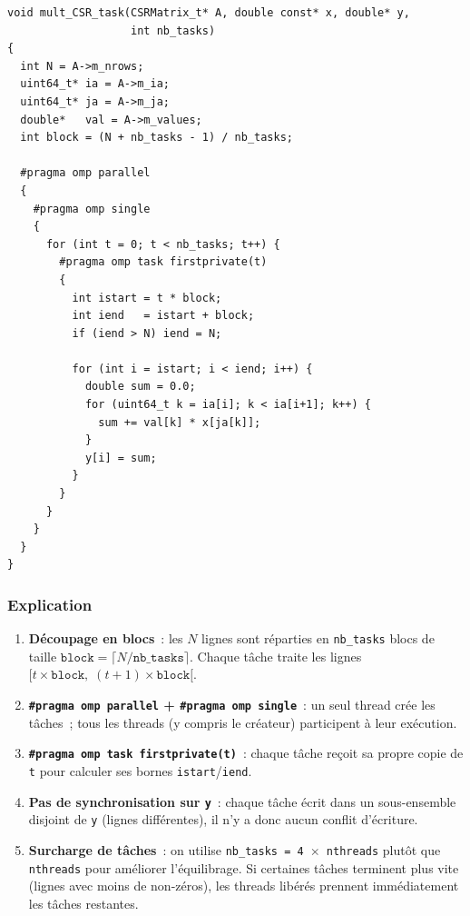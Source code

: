 \documentclass[12pt,a4paper]{article}
\begin{document}
\begin{lstlisting}[style=cstyle]
void mult_CSR_task(CSRMatrix_t* A, double const* x, double* y,
                   int nb_tasks)
{
  int N = A->m_nrows;
  uint64_t* ia = A->m_ia;
  uint64_t* ja = A->m_ja;
  double*   val = A->m_values;
  int block = (N + nb_tasks - 1) / nb_tasks;

  #pragma omp parallel
  {
    #pragma omp single
    {
      for (int t = 0; t < nb_tasks; t++) {
        #pragma omp task firstprivate(t)
        {
          int istart = t * block;
          int iend   = istart + block;
          if (iend > N) iend = N;

          for (int i = istart; i < iend; i++) {
            double sum = 0.0;
            for (uint64_t k = ia[i]; k < ia[i+1]; k++) {
              sum += val[k] * x[ja[k]];
            }
            y[i] = sum;
          }
        }
      }
    }
  }
}
\end{lstlisting}

\subsubsection{Explication}

\begin{enumerate}
  \item \textbf{Découpage en blocs}~: les $N$ lignes sont réparties en \texttt{nb\_tasks} blocs de taille $\texttt{block} = \lceil N / \texttt{nb\_tasks} \rceil$. Chaque tâche traite les lignes $[t \times \texttt{block},\; (t+1) \times \texttt{block}[$.

  \item \textbf{\texttt{\#pragma omp parallel} + \texttt{\#pragma omp single}}~: un seul thread crée les tâches~; tous les threads (y compris le créateur) participent à leur exécution.

  \item \textbf{\texttt{\#pragma omp task firstprivate(t)}}~: chaque tâche reçoit sa propre copie de \texttt{t} pour calculer ses bornes \texttt{istart}/\texttt{iend}.

  \item \textbf{Pas de synchronisation sur \texttt{y}}~: chaque tâche écrit dans un sous-ensemble disjoint de \texttt{y} (lignes différentes), il n'y a donc aucun conflit d'écriture.

  \item \textbf{Surcharge de tâches}~: on utilise \texttt{nb\_tasks = 4 $\times$ nthreads} plutôt que \texttt{nthreads} pour améliorer l'équilibrage. Si certaines tâches terminent plus vite (lignes avec moins de non-zéros), les threads libérés prennent immédiatement les tâches restantes.
\end{enumerate}
\end{document}
